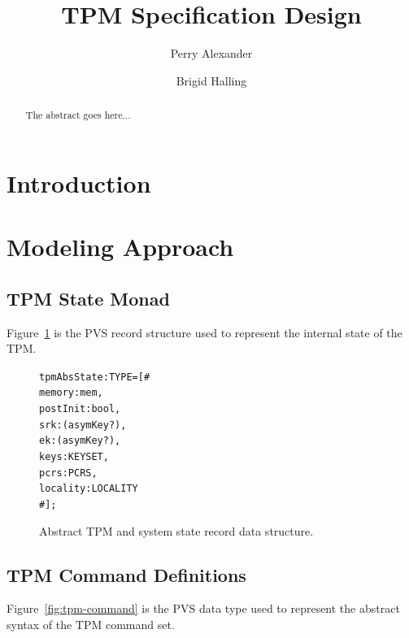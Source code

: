 \documentclass[10pt]{article}
\title{TPM Specification Design}
\author{Perry Alexander \and Brigid Halling}
\begin{document}
\maketitle
\tableofcontents
\listoffigures
\listoftables

\begin{abstract}
  The abstract goes here...
\end{abstract}

\section{Introduction}

\section{Modeling Approach}

\subsection{TPM State Monad}

Figure~\ref{fig:tpm-abs-state} is the PVS record structure used to
represent the internal state of the TPM.

\begin{figure}
\begin{alltt}
  tpmAbsState : TYPE = [#
                       memory : mem,
                       postInit : bool,
                       srk : (asymKey?),
                       ek : (asymKey?),
                       keys : KEYSET,
                       pcrs : PCRS,
                       locality : LOCALITY
                       #];
\end{alltt}
\caption{Abstract TPM and system state record data structure.}
\label{fig:tpm-abs-state}
\end{figure}

\subsection{TPM Command Definitions}

Figure~\ref{fig:tpm-command} is the PVS data type used to represent
the abstract syntax of the TPM command set.
\end{document}
